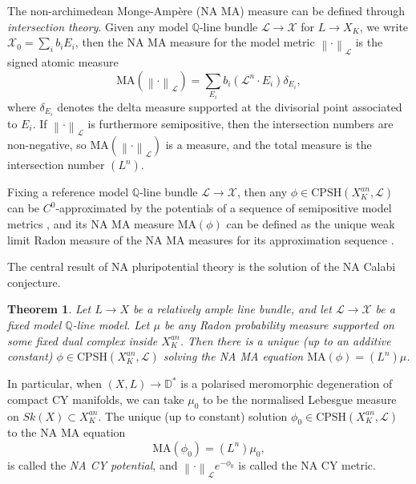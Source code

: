\documentclass[a4paper]{article}
\newtheorem{thm}{Theorem}[section]
\theoremstyle{definition}
\newcommand{\Q}{\mathbb{Q}}
\newcommand{\norm}[1]{\left\lVert#1\right\rVert}
\begin{document}
	
	
	The non-archimedean Monge-Amp\`ere (NA MA) measure can be defined through \emph{intersection theory}. 
	Given any model $\Q$-line bundle $\mathcal{L}\to \mathcal{X}$ for  $L\to X_K$, we write $\mathcal{X}_0= \sum_i b_i E_i$, then the NA MA measure for the model metric $\norm{\cdot}_ {\mathcal{L} }$ is the signed atomic measure
	\[
	\text{MA}( \norm{\cdot}_{ \mathcal{L} } )= \sum_{E_i} b_i (\mathcal{L}^n\cdot E_i) \delta_{E_i},
	\] 
	where $\delta_{E_i}$ denotes the delta measure supported at the divisorial point  associated to $E_i$. If $\norm{\cdot}_{\mathcal{L}  }$ is furthermore semipositive, then the intersection numbers are non-negative, so $\text{MA}( \norm{\cdot}_{ \mathcal{L} } )$ is a measure, and the total measure is the intersection number $(L^n)$. 
	
	
	
	
	Fixing a reference model $\Q$-line bundle $\mathcal{L}\to \mathcal{X}$, then any $\phi\in \text{CPSH}(X_K^{an}, \mathcal{L})$ can be $C^0$-approximated by the potentials of a sequence of  semipositive model metrics \cite[Cor. 8.8]{Boucksomsemipositive}, and its NA MA measure $\text{MA}(\phi)$ can be defined as the unique weak limit Radon measure of the NA MA measures for its approximation sequence \cite[Cor. 3.5]{Boucksom}.
	
	
	

	
	
	
	
	
	
	
	The central result of NA pluripotential theory is the solution of the NA Calabi conjecture.
	
	\begin{thm}\label{thm:BFJ}
		\cite{Boucksomsurvey, Boucksom} Let $L\to X$ be a relatively ample line bundle, and let $\mathcal{L}\to \mathcal{X}$ be a fixed model $\Q$-line model. Let $\mu$ be any Radon probability measure supported on some fixed dual complex inside $X_K^{an}$. Then there is a unique (up to an additive constant) $\phi \in \text{CPSH}(X_K^{an}, \mathcal{L})$ solving the NA MA equation $\text{MA}(\phi )=(L^n)\mu$.
	\end{thm}
	
	
	
	
	
	In particular, when $(X,L)\to \mathbb{D}^*$ is a polarised meromorphic degeneration of compact CY manifolds, we can take $\mu_0$ to be the normalised Lebesgue measure on $Sk(X)\subset X_K^{an}$. The unique (up to constant) solution $\phi_0\in \text{CPSH}(X_K^{an}, \mathcal{L})$ to the NA MA equation
	\begin{equation}
	\text{MA}(\phi_0)= (L^n) \mu_0,
	\end{equation}
	is called the \emph{NA CY potential}, and $\norm{\cdot}_{\mathcal{L}} e^{-\phi_0}$ is called the NA CY metric.
	
\end{document}
